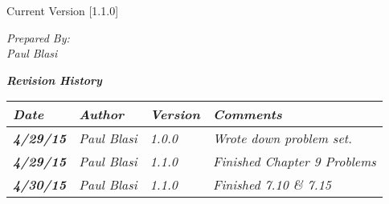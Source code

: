 


Current Version [1.1.0]
\vspace*{5mm}

{\color{MSBlue3}
\noindent
\textit{Prepared By:}\\
\textit{Paul Blasi}\\
}

\vfill
\noindent
{\color{color02} \textit{\textbf{Revision History}}}\\
\begin{tabular}{|>{\raggedright}p{1.5cm}|>{\raggedright}p{3cm}|>{\raggedright}p{1.5cm}|>{\raggedright}p{9cm}|}
\hline
\textit{\textbf{Date}} &  \textit{\textbf{Author}} & \textit{\textbf{Version}} & \textit{\textbf{Comments}}\tabularnewline
\hline
 \textit{\textbf{4/29/15}} & \textit{Paul Blasi} & \textit{1.0.0} & \textit{Wrote down problem set.}\tabularnewline
\hline
\textit{\textbf{4/29/15}} & \textit{Paul Blasi} & \textit{1.1.0} & \textit{Finished Chapter 9 Problems}\tabularnewline
\hline
\textit{\textbf{4/30/15}} & \textit{Paul Blasi} & \textit{1.1.0} & \textit{Finished 7.10 \& 7.15}\tabularnewline
\hline
\end{tabular}
\vfill

